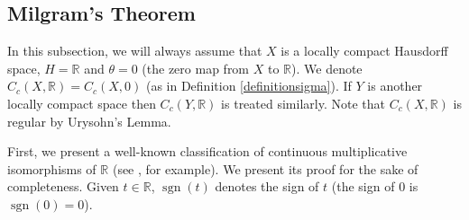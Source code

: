 %
%
%

\subsection{Milgram's Theorem}

In this subsection, we will always assume that $X$ is a locally compact Hausdorff space, $H=\mathbb{R}$ and $\theta=0$ (the zero map from $X$ to $\mathbb{R}$). We denote $C_c(X,\mathbb{R})=C_c(X,0)$ (as in Definition \ref{definitionsigma}). If $Y$ is another locally compact space then $C_c(Y,\mathbb{R})$ is treated similarly. Note that $C_c(X,\mathbb{R})$ is regular by Urysohn's Lemma.

First, we present a well-known classification of continuous multiplicative isomorphisms of $\mathbb{R}$ (see \cite[Lemma 4.3]{MR0029476}, for example). We present its proof for the sake of completeness. Given $t\in\mathbb{R}$, $\operatorname{sgn}(t)$ denotes the sign of $t$ (the sign of $0$ is $\operatorname{sgn}(0)=0$).%

